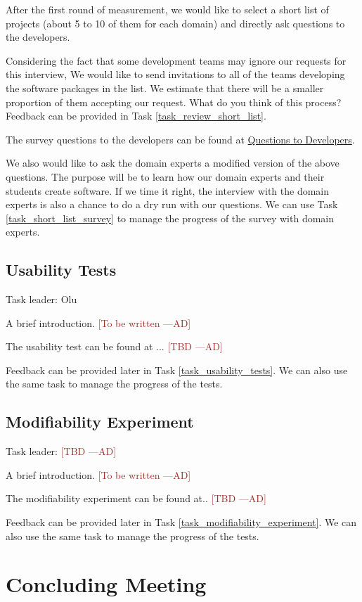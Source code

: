 \documentclass[12pt]{article}
\newcommand{\authornote}[3]{\textcolor{#1}{[#3 ---#2]}}
\newcommand{\authornote}[3]{}
\newcommand{\ad}[1]{\authornote{brown}{AD}{#1}} %
\begin{document}
After the first round of measurement, we would like to select a short list of
projects (about 5 to 10 of them for each domain) and directly ask questions to the
developers.

Considering the fact that some development teams may ignore our requests for
this interview, We would like to send invitations to all of the teams developing
the software packages in the list. We estimate that there will be a smaller
proportion of them accepting our request. What do you think of
this process? Feedback can be provided in Task \ref{task_review_short_list}.

The survey questions to the developers can be found at
\href{https://github.com/smiths/AIMSS/blob/master/StateOfPractice/Methodology/Questions%20to%20Developers.pdf}{Questions
	to Developers}.

We also would like to ask the domain experts a modified version of the above
questions. The purpose will be to learn how our domain experts and their
students create software. If we time it right, the interview with the domain
experts is also a chance to do a dry run with our questions. We can use Task
\ref{task_short_list_survey} to manage the progress of the survey with domain
experts.

\subsection{Usability Tests}
\label{usability_tests}
Task leader: Olu

A brief introduction. \ad{To be written}

The usability test can be found at ... \ad{TBD}

Feedback can be provided later in Task
\ref{task_usability_tests}. We can also use the same task to manage the progress of the tests.

\subsection{Modifiability Experiment}
\label{modifiability_experiment}
Task leader: \ad{TBD}

A brief introduction. \ad{To be written} 

The modifiability experiment can be found at.. \ad{TBD}

Feedback can be provided later in Task
\ref{task_modifiability_experiment}. We can also use the same task to manage the
progress of the tests.

\section{Concluding Meeting}
\label{concluding_meeting}
\end{document}
